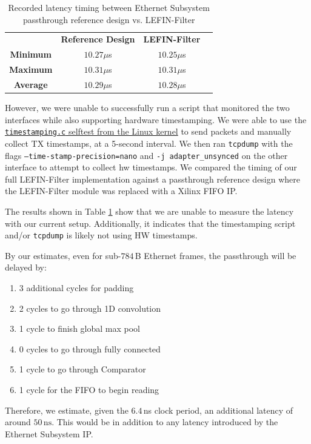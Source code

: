 \documentclass[conference]{IEEEtran}
\begin{document}
\begin{table}[t]
    \centering
    \begin{tabular}{cccc}
                         & \textbf{Reference Design} & \textbf{LEFIN-Filter} \\
        \textbf{Minimum} & $10.27\mu$s               & $10.25\mu$s           \\
        \textbf{Maximum} & $10.31\mu$s               & $10.31\mu$s           \\
        \textbf{Average} & $10.29\mu$s               & $10.28\mu$s
    \end{tabular}
    \caption{Recorded latency timing between Ethernet Subsystem passthrough reference design vs. LEFIN-Filter}
    \label{tab:results-latency}
\end{table}

However, we were unable to successfully run a script
that monitored the two interfaces while also supporting
hardware timestamping.
We were able to use the \href{https://github.com/torvalds/linux/blob/d358e5254674b70f34c847715ca509e46eb81e6f/tools/testing/selftests/net/timestamping.c}
{\texttt{timestamping.c} selftest from the Linux kernel}
to send packets and manually collect TX timestamps,
at a 5-second interval.
We then ran \texttt{tcpdump} with the flags
\texttt{--time-stamp-precision=nano} and
\texttt{-j adapter\_unsynced}
on the other interface to attempt to collect hw timestamps.
We compared the timing of our full LEFIN-Filter implementation
against a passthrough reference design where the LEFIN-Filter module
was replaced with a Xilinx FIFO IP.

The results shown in Table \ref{tab:results-latency}
show that we are unable to measure the latency with our current setup.
Additionally, it indicates that the timestamping script and/or
\texttt{tcpdump} is likely not using HW timestamps.

By our estimates, even for sub-$784\,$B Ethernet frames,
the passthrough will be delayed by:
\begin{enumerate}
    \item 3 additional cycles for padding
    \item 2 cycles to go through 1D convolution
    \item 1 cycle to finish global max pool
    \item 0 cycles to go through fully connected
    \item 1 cycle to go through Comparator
    \item 1 cycle for the FIFO to begin reading
\end{enumerate}
Therefore, we estimate, given the $6.4\,$ns clock period,
an additional latency of around $50\,\text{ns}$.
This would be in addition to any latency introduced by the
Ethernet Subsystem IP.
\end{document}
